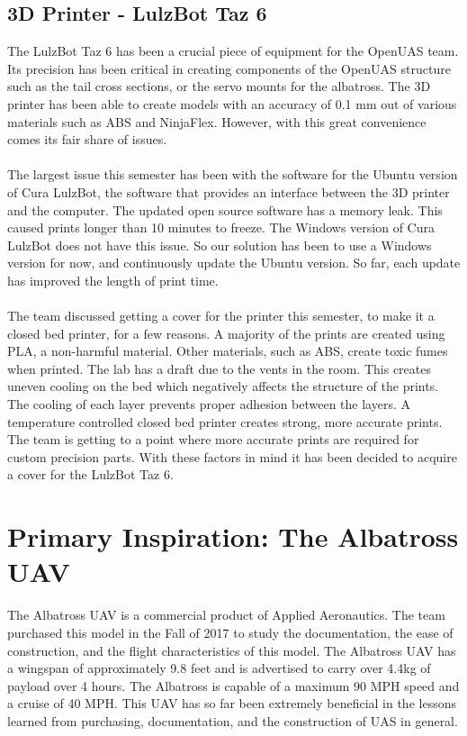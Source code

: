 \documentclass{article}
\begin{document}
\subsection{3D Printer - LulzBot Taz 6}
The LulzBot Taz 6 has been a crucial piece of equipment for the OpenUAS team. Its precision has been critical in creating components of the OpenUAS structure such as the tail cross sections, or the servo mounts for the albatross. The 3D printer has been able to create models with an accuracy of 0.1 mm out of various materials such as ABS and NinjaFlex. However, with this great convenience comes its fair share of issues.
\\
\\The largest issue this semester has been with the software for the Ubuntu version of Cura LulzBot, the software that provides an interface between the 3D printer and the computer. The updated open source software has a memory leak. This caused prints longer than 10 minutes to freeze. The Windows version of Cura LulzBot does not have this issue. So our solution has been to use a Windows version for now, and continuously update the Ubuntu version. So far, each update has improved the length of print time.
\\
\\The team discussed getting a cover for the printer this semester, to make it a closed bed printer, for a few reasons. A majority of the prints are created using PLA, a non-harmful material. Other materials, such as ABS, create toxic fumes when printed. The lab has a draft due to the vents in the room. This creates uneven cooling on the bed which negatively affects the structure of the prints. The cooling of each layer prevents proper adhesion between the layers. A temperature controlled closed bed printer creates strong, more accurate prints. The team is getting to a point where more accurate prints are required for custom precision parts. With these factors in mind it has been decided to acquire a cover for the LulzBot Taz 6.


\section{Primary Inspiration: The Albatross UAV}
\noindent The Albatross UAV is a commercial product of Applied Aeronautics. The team purchased this model in the Fall of 2017 to study the documentation, the ease of construction, and the flight characteristics of this model. The Albatross UAV has a wingspan of approximately 9.8 feet and is advertised to carry over 4.4kg of payload over 4 hours. The Albatross is capable of a maximum 90 MPH speed and a cruise of 40 MPH. This UAV has so far been extremely beneficial in the lessons learned from purchasing, documentation, and the construction of UAS in general. 
\end{document}
